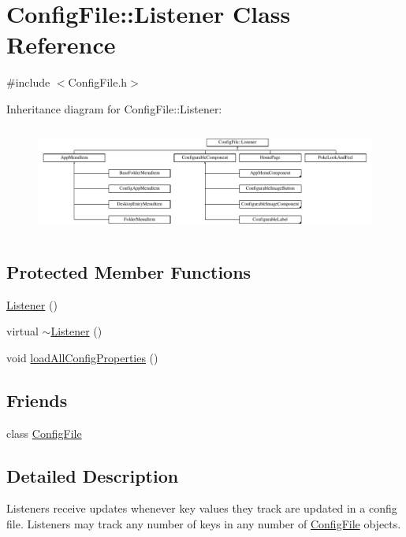 \hypertarget{classConfigFile_1_1Listener}{}\section{Config\+File\+:\+:Listener Class Reference}
\label{classConfigFile_1_1Listener}


{\ttfamily \#include $<$Config\+File.\+h$>$}

Inheritance diagram for Config\+File\+:\+:Listener\+:\begin{figure}[H]
\begin{center}
\leavevmode
\includegraphics[height=3.555556cm]{classConfigFile_1_1Listener}
\end{center}
\end{figure}
\subsection*{Protected Member Functions}
\begin{DoxyCompactItemize}
\item 
\mbox{\hyperlink{classConfigFile_1_1Listener_af8f0bbca45e2dbc56aa71bd78b65aeed}{Listener}} ()
\item 
virtual \mbox{\hyperlink{classConfigFile_1_1Listener_acc7fc4ebc0b3f85b6092e84dbec4ac5f}{$\sim$\+Listener}} ()
\item 
void \mbox{\hyperlink{classConfigFile_1_1Listener_a766f4c212ec0dc6bd79622f2d7a50760}{load\+All\+Config\+Properties}} ()
\end{DoxyCompactItemize}
\subsection*{Friends}
\begin{DoxyCompactItemize}
\item 
class \mbox{\hyperlink{classConfigFile_1_1Listener_a1b8ab5fe482c5910209dfb9815de99c4}{Config\+File}}
\end{DoxyCompactItemize}


\subsection{Detailed Description}
Listeners receive updates whenever key values they track are updated in a config file. Listeners may track any number of keys in any number of \mbox{\hyperlink{classConfigFile}{Config\+File}} objects. 

